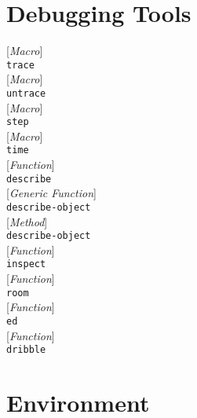 \documentclass[10pt]{book}
\newenvironment{defother}[2]{[\textit{#1}]\\\texttt{#2}}{\\}
\newenvironment{defun}[1]{\begin{defother}{Function}{#1}}{\end{defother}}
\newenvironment{defgeneric}[1]{\begin{defother}{Generic Function}{#1}}{\end{defother}}
\newenvironment{defmethod}[1]{\begin{defother}{Method}{#1}}{\end{defother}}
\newenvironment{defmacro}[1]{\begin{defother}{Macro}{#1}}{\end{defother}}
\begin{document}
\section{Debugging Tools}
\begin{defmacro}{trace}\end{defmacro}
\begin{defmacro}{untrace}\end{defmacro}
\begin{defmacro}{step}\end{defmacro}
\begin{defmacro}{time}\end{defmacro}
\begin{defun}{describe}\end{defun}
\begin{defgeneric}{describe-object}\end{defgeneric}
\begin{defmethod}{describe-object}\end{defmethod}
\begin{defun}{inspect}\end{defun}
\begin{defun}{room}\end{defun}
\begin{defun}{ed}\end{defun}
\begin{defun}{dribble}\end{defun}
\section{Environment}
\end{document}
